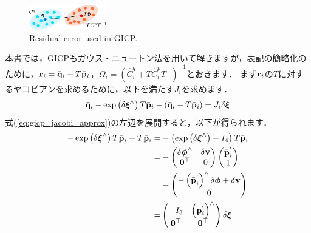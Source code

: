 \begin{figure}[!t]
  \centering
  \includegraphics[width=0.3\textwidth]{../figs/gicp_residual.pdf}
  \caption{Residual error used in GICP.}
  \label{fig:gicp_residual}
\end{figure}


本書では，GICPもガウス・ニュートン法を用いて解きますが，表記の簡略化のために，${\bf r}_{i} = \bar{ {\bf q} }_{i} - T \bar{ {\bf p} }_{i}$，$\Omega_{i} = \left( \hat{C}_{i}^{q} + T \hat{C}_{i}^{p} T^{\top} \right)^{-1}$とおきます．
まず${\bf r}_{i}$の$T$に対するヤコビアンを求めるために，以下を満たす$J_{i}$を求めます．
%
\begin{align}
  \bar{ {\bf q} }_{i} - \exp \left( \delta \boldsymbol \xi^{\wedge} \right) T \bar{ {\bf p} }_{i} - \left( \bar{ {\bf q} }_{i} - T \bar{ {\bf p} }_{i} \right) = J_{i} \delta \boldsymbol \xi
  \label{eq:gicp_jacobi_approx}
\end{align}
%
式(\ref{eq:gicp_jacobi_approx})の左辺を展開すると，以下が得られます．
%
\begin{align}
  \begin{split}
    -\exp \left( \delta \boldsymbol \xi^{\wedge} \right) T \bar{ {\bf p} }_{i} + T \bar{ {\bf p} }_{i}
%
    = & - \left( \exp \left( \delta \boldsymbol \xi^{\wedge} \right) - I_{4} \right) T \bar{ {\bf p} }_{i} \\
%
    = & - \left( \begin{matrix}
            \delta \boldsymbol \phi^{\wedge} & \delta {\bf v} \\
            {\bf 0}^{\top}                   & 0
          \end{matrix} \right)
          \left( \begin{matrix}
            \bar{ {\bf p} }_{i}^{'} \\
            1
          \end{matrix} \right) \\
%
    = & - \left( \begin{matrix}
            - \left( \bar{ {\bf p} }_{i}^{'} \right)^{\wedge} \delta \boldsymbol \phi + \delta {\bf v} \\
            0
          \end{matrix} \right) \\
%
    = & \left( \begin{matrix}
          -I_{3}         & \left( \bar{ {\bf p} }_{i}^{'} \right)^{\wedge} \\
          {\bf 0}^{\top} & {\bf 0}^{\top}
        \end{matrix} \right) \delta \boldsymbol \xi \\
  \end{split}
\end{align}
